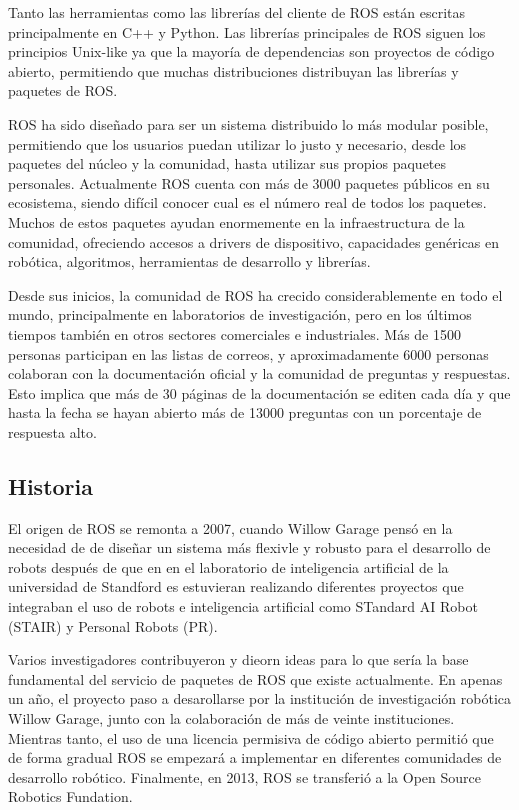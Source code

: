 Tanto las herramientas como las librerías del cliente de ROS están escritas
principalmente en C++ y Python. Las librerías principales de ROS siguen los
principios Unix-like ya que la mayoría de dependencias son proyectos de código
abierto, permitiendo que muchas distribuciones distribuyan las librerías y
paquetes de ROS.

ROS ha sido diseñado para ser un sistema distribuido lo más modular posible,
permitiendo que los usuarios puedan utilizar lo justo y necesario, desde los
paquetes del núcleo y la comunidad, hasta utilizar sus propios paquetes
personales. Actualmente ROS cuenta con más de 3000 paquetes públicos en su
ecosistema, siendo difícil conocer cual es el número real de todos los paquetes.
Muchos de estos paquetes ayudan enormemente en la infraestructura de la
comunidad, ofreciendo accesos a drivers de dispositivo, capacidades genéricas en
robótica, algoritmos, herramientas de desarrollo y librerías.

Desde sus inicios, la comunidad de ROS ha crecido considerablemente en todo el
mundo, principalmente en laboratorios de investigación, pero en los últimos
tiempos también en otros sectores comerciales e industriales. Más de 1500
personas participan en las listas de correos, y aproximadamente 6000 personas
colaboran con la documentación oficial y la comunidad de preguntas y respuestas.
Esto implica que más de 30 páginas de la documentación se editen cada día y que
hasta la fecha se hayan abierto más de 13000 preguntas con un porcentaje de
respuesta alto.

\subsection{Historia}

El origen de ROS se remonta a 2007, cuando Willow Garage pensó en la necesidad
de de diseñar un sistema más flexivle y robusto para el desarrollo de robots
después de que en en el laboratorio de inteligencia artificial de la universidad
de Standford es estuvieran realizando diferentes proyectos que integraban el uso
de robots e inteligencia artificial como STandard AI Robot (STAIR) y Personal
Robots (PR).

Varios investigadores contribuyeron y dieorn ideas para lo que sería la base
fundamental del servicio de paquetes de ROS que existe actualmente. En apenas un
año, el proyecto paso a desarollarse por la institución de investigación
robótica Willow Garage, junto con la colaboración de más de veinte
instituciones. Mientras tanto, el uso de una licencia permisiva de código
abierto permitió que de forma gradual ROS se empezará a implementar en 
diferentes comunidades de desarrollo robótico. Finalmente, en 2013, ROS se
transferió a la Open Source Robotics Fundation.

